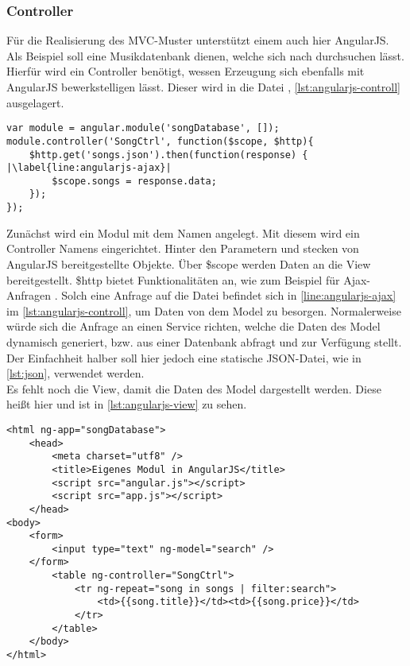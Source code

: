 \subsubsection{Controller}
Für die Realisierung des MVC-Muster unterstützt einem auch hier AngularJS. Als Beispiel soll eine Musikdatenbank dienen, welche sich nach durchsuchen lässt. Hierfür wird ein Controller benötigt, wessen Erzeugung sich ebenfalls mit AngularJS bewerkstelligen lässt. Dieser wird in die Datei , \autoref{lst:angularjs-controll} ausgelagert.

\begin{lstlisting}[style=htmlcssjs, caption=Ein Controller für das MVC-Muster einer Musikdatenbank, label=lst:angularjs-controll,escapechar=|]
var module = angular.module('songDatabase', []);
module.controller('SongCtrl', function($scope, $http){ 
	$http.get('songs.json').then(function(response) { |\label{line:angularjs-ajax}|
		$scope.songs = response.data;
	});
});
\end{lstlisting}

Zunächst wird ein Modul mit dem Namen  angelegt. Mit diesem wird ein Controller Namens  eingerichtet. Hinter den Parametern  und  stecken von AngularJS bereitgestellte Objekte. Über \$scope werden Daten an die View bereitgestellt. \$http bietet Funktionalitäten an, wie zum Beispiel für Ajax-Anfragen \cite[S. 37]{ste15}. Solch eine Anfrage auf die Datei  befindet sich in \autoref{line:angularjs-ajax} im \autoref{lst:angularjs-controll}, um Daten von dem Model zu besorgen. Normalerweise würde sich die Anfrage an einen Service richten, welche die Daten des Model dynamisch generiert, bzw. aus einer Datenbank abfragt und zur Verfügung stellt. Der Einfachheit halber soll hier jedoch eine statische JSON-Datei, wie in \autoref{lst:json}, verwendet werden.\\
Es fehlt noch die View, damit die Daten des Model dargestellt werden. Diese heißt hier  und ist in \autoref{lst:angularjs-view} zu sehen.

\begin{lstlisting}[style=htmlcssjs, caption=Ein Javascript Beispiel, label=lst:angularjs-view]
<html ng-app="songDatabase">
	<head>
		<meta charset="utf8" />
		<title>Eigenes Modul in AngularJS</title>
		<script src="angular.js"></script>
		<script src="app.js"></script>
	</head>
<body>
	<form>
		<input type="text" ng-model="search" />
	</form>
		<table ng-controller="SongCtrl">
			<tr ng-repeat="song in songs | filter:search">
				<td>{{song.title}}</td><td>{{song.price}}</td>
			</tr>
		</table>
	</body>
</html>
\end{lstlisting}